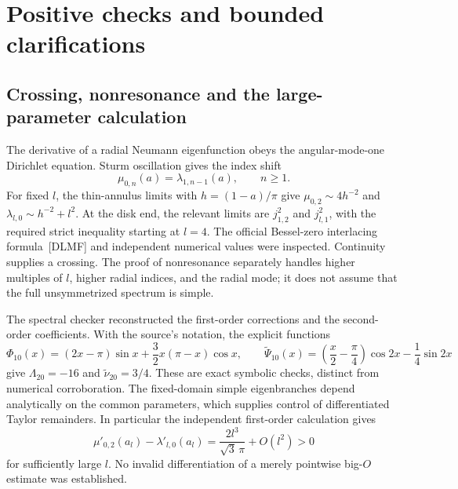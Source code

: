 \documentclass[10pt]{article}
\begin{document}
\section*{Positive checks and bounded clarifications}
\subsection*{Crossing, nonresonance and the large-parameter calculation}
The derivative of a radial Neumann eigenfunction obeys the angular-mode-one Dirichlet equation. Sturm oscillation gives the index shift \[\mu_{0,n}(a)=\lambda_{1,n-1}(a),\qquad n\ge1.\] For fixed \(l\), the thin-annulus limits with \(h=(1-a)/\pi\) give \(\mu_{0,2}\sim4h^{-2}\) and \(\lambda_{l,0}\sim h^{-2}+l^2\). At the disk end, the relevant limits are \(j_{1,2}^2\) and \(j_{l,1}^2\), with the required strict inequality starting at \(l=4\). The official Bessel-zero interlacing formula [DLMF] and independent numerical values were inspected. Continuity supplies a crossing. The proof of nonresonance separately handles higher multiples of \(l\), higher radial indices, and the radial mode; it does not assume that the full unsymmetrized spectrum is simple.\par
The spectral checker reconstructed the first-order corrections and the second-order coefficients. With the source’s notation, the explicit functions \[\Phi_{10}(x)=(2x-\pi)\sin x+\frac32x(\pi-x)\cos x,
 \qquad
 \widetilde\Psi_{10}(x)=
 \left(\frac x2-\frac\pi4\right)\cos2x-\frac14\sin2x\] give \(\Lambda_{20}=-16\) and \(\widetilde\nu_{20}=3/4\). These are exact symbolic checks, distinct from numerical corroboration. The fixed-domain simple eigenbranches depend analytically on the common parameters, which supplies control of differentiated Taylor remainders. In particular the independent first-order calculation gives \[\mu'_{0,2}(a_l)-\lambda'_{l,0}(a_l)
 =\frac{2l^3}{\sqrt3\,\pi}+O(l^2)>0\] for sufficiently large \(l\). No invalid differentiation of a merely pointwise big-\(O\) estimate was established.\par
\end{document}
